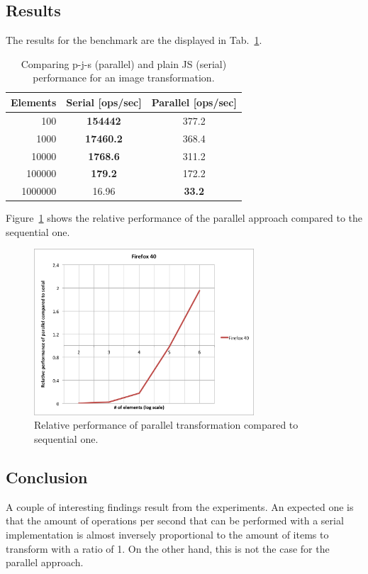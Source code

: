 \documentclass[runningheads,a4paper]{llncs}
\begin{document}
\subsection{Results}
The results for the benchmark are the displayed in Tab.~\ref{tab:benchmark}.
\begin{table}
  \centering
  \begin{tabular}{|r|c|c|}
    \hline
    Elements & Serial [ops/sec] & Parallel [ops/sec] \\
    \hline
    100 & \textbf{154442} & 377.2\\
    1000 & \textbf{17460.2} &  368.4 \\
    10000 & \textbf{1768.6} & 311.2 \\
    100000 & \textbf{179.2} & 172.2 \\
    1000000 & 16.96 & \textbf{33.2} \\
    \hline
  \end{tabular}
  \caption{Comparing p-j-s (parallel) and plain JS (serial) performance for an image transformation.}
  \label{tab:benchmark}
\end{table}

Figure~\ref{fig:relative} shows the relative performance of the parallel approach compared to the sequential one.

\begin{figure}
\centering
\includegraphics[height=6.2cm]{comparison}
\caption{Relative performance of parallel transformation compared to sequential one.}
\label{fig:relative}
\end{figure}

\subsection{Conclusion}
A couple of interesting findings result from the experiments. An expected one is that the amount of operations per second that can be performed with a serial implementation is almost inversely proportional to the amount of items to transform with a ratio of 1. On the other hand, this is not the case for the parallel approach.
\end{document}
